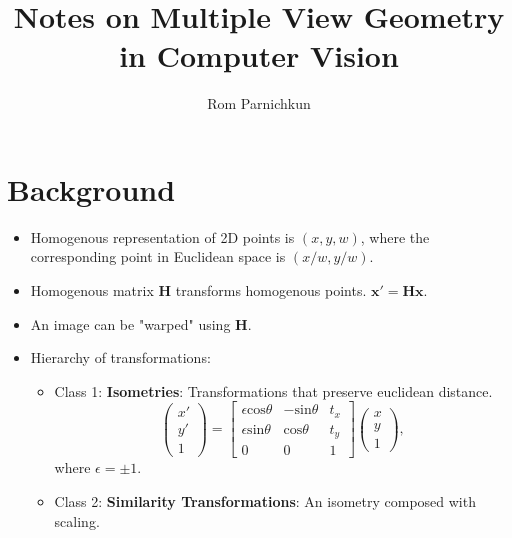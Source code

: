 \documentclass[twocolumn]{article}
\begin{document}
\title{Notes on Multiple View Geometry in Computer Vision}
\author{Rom Parnichkun}

\maketitle

\section{Background}

\begin{itemize}
    \item Homogenous representation of 2D points is $(x,y,w)$, where the corresponding point in Euclidean space is $(x/w,y/w)$.
    \item Homogenous matrix $\textbf{H}$ transforms homogenous points. $\textbf{x}'=\textbf{Hx}$. 
    \item An image can be "warped" using $\textbf{H}$.
    \item Hierarchy of transformations:
    \begin{itemize}
        \item Class 1: \textbf{Isometries}: Transformations that preserve euclidean distance. 
            \begin{equation}
                \begin{pmatrix}
                    x' \\ y' \\ 1
                \end{pmatrix} =
                \begin{bmatrix}
                    \epsilon \text{cos} \theta  & - \text{sin} \theta   & t_x \\
                    \epsilon \text{sin} \theta  & \text{cos} \theta     & t_y \\
                    0                  & 0                     & 1
                \end{bmatrix}\begin{pmatrix}
                    x \\ y \\ 1
                \end{pmatrix}, 
            \end{equation}
            where $\epsilon = \pm 1$.
        \item Class 2: \textbf{Similarity Transformations}: An isometry composed with scaling.
            \begin{equation}

\end{equation}
\end{itemize}
\end{itemize}
\end{document}
